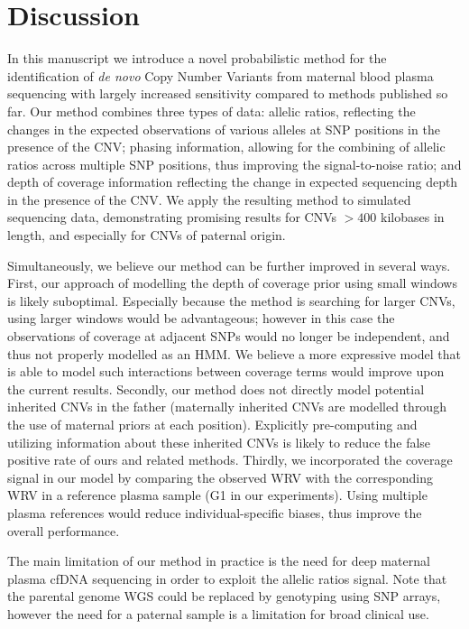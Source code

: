 \section{Discussion}

In this manuscript we introduce a novel probabilistic method for the identification of \textit{de novo} Copy Number Variants from maternal blood plasma sequencing with largely increased sensitivity compared to methods published so far. Our method combines three types of data: allelic ratios, reflecting the changes in the expected observations of various alleles at SNP positions in the presence of the CNV; phasing information, allowing for the combining of allelic ratios across multiple SNP positions, thus improving the signal-to-noise ratio; and depth of coverage information reflecting the change in expected sequencing depth in the presence of the CNV. We apply the resulting method to simulated sequencing data, demonstrating promising results for CNVs ${>400}$ kilobases in length, and especially for CNVs of paternal origin. 

Simultaneously, we believe our method can be further improved in several ways. First, our approach of modelling the depth of coverage prior using small windows is likely suboptimal. Especially because the method is searching for larger CNVs, using larger windows	 would be advantageous; however in this case the observations of coverage at adjacent SNPs would no longer be independent,  and thus not properly modelled as an HMM. We believe a more expressive model that is able to model such interactions between coverage terms would improve upon the current results. Secondly, our method does not directly model potential inherited CNVs in the father (maternally inherited CNVs are modelled through the use of maternal priors at each position). Explicitly pre-computing and utilizing information about these inherited CNVs is likely to reduce the false positive rate of ours and related methods. Thirdly, we incorporated the coverage signal in our model by comparing the observed WRV with the corresponding WRV in a reference plasma sample (G1 in our experiments). Using multiple plasma references would reduce individual-specific biases, thus improve the overall performance.

The main limitation of our method in practice is the need for deep maternal plasma cfDNA sequencing in order to exploit the allelic ratios signal. Note that the parental genome WGS could be replaced by genotyping using SNP arrays, however the need for a paternal sample is a limitation for broad clinical use. 
